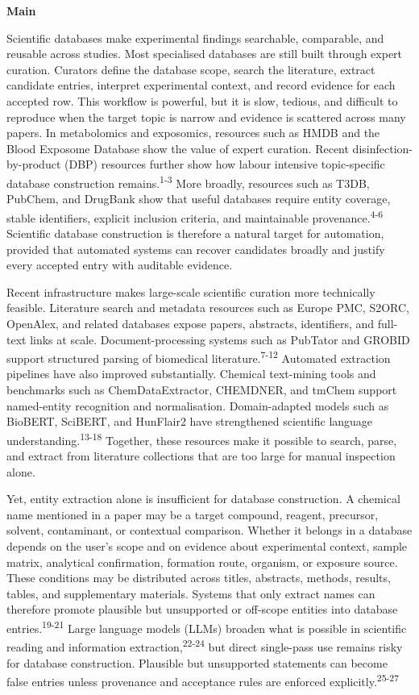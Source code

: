 \documentclass[
]{article}
\begin{document}
\textbf{Main}

Scientific databases make experimental findings searchable, comparable,
and reusable across studies. Most specialised databases are still built
through expert curation. Curators define the database scope, search the
literature, extract candidate entries, interpret experimental context,
and record evidence for each accepted row. This workflow is powerful, but
it is slow, tedious, and difficult to reproduce when the target topic is
narrow and evidence is scattered across many papers. In metabolomics and
exposomics, resources such as HMDB and the Blood Exposome Database show
the value of expert curation. Recent disinfection-by-product (DBP)
resources further show how labour intensive topic-specific database
construction remains.\textsuperscript{1-3} More broadly, resources such
as T3DB, PubChem, and DrugBank show that useful databases require entity
coverage, stable identifiers, explicit inclusion criteria, and
maintainable provenance.\textsuperscript{4-6} Scientific database
construction is therefore a natural target for automation, provided that
automated systems can recover candidates broadly and justify every
accepted entry with auditable evidence.

Recent infrastructure makes large-scale scientific curation more
technically feasible. Literature search and metadata resources such as
Europe PMC, S2ORC, OpenAlex, and related databases expose papers,
abstracts, identifiers, and full-text links at scale. Document-processing
systems such as PubTator and GROBID support structured parsing of
biomedical literature.\textsuperscript{7-12} Automated extraction
pipelines have also improved substantially. Chemical text-mining tools
and benchmarks such as ChemDataExtractor, CHEMDNER, and tmChem support
named-entity recognition and normalisation. Domain-adapted models such as
BioBERT, SciBERT, and HunFlair2 have strengthened scientific language
understanding.\textsuperscript{13-18} Together, these resources make it
possible to search, parse, and extract from literature collections that
are too large for manual inspection alone.

Yet, entity extraction alone is insufficient for database construction. A
chemical name mentioned in a paper may be a target compound, reagent,
precursor, solvent, contaminant, or contextual comparison. Whether it
belongs in a database depends on the user's scope and on evidence about
experimental context, sample matrix, analytical confirmation, formation
route, organism, or exposure source. These conditions may be distributed
across titles, abstracts, methods, results, tables, and supplementary
materials. Systems that only extract names can therefore promote plausible
but unsupported or off-scope entities into database entries.\textsuperscript{19-21}
Large language models (LLMs) broaden what is possible in scientific
reading and information extraction,\textsuperscript{22-24} but direct
single-pass use remains risky for database construction. Plausible but
unsupported statements can become false entries unless provenance and
acceptance rules are enforced explicitly.\textsuperscript{25-27}
\end{document}
